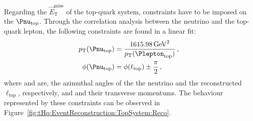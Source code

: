 \begin{comment}
\begin{figure}[h] 
	\begin{subfigure}{0.45\textwidth}
	\texttt{[image: Chapter5\_tHq/Reconstruction/Pzv\_vs\_Pzl\_truth\_alp05]}
	\caption{Truth $p_{z}(\ell_{\text{top}})$ vs. Truth $p_{z}(\nu)$}
	\label{fig:tHq:EventReconstruction:TopSystem:hypothesis1:A}
	\end{subfigure}
\hfill 
	\begin{subfigure}{0.45\textwidth}
	\texttt{[image: Chapter5\_tHq/Reconstruction/Pzv\_vs\_Pzl\_Reco\_alp05]}
	\caption{Reco. $p_{z}(\elll_{\text{top}})$ vs. Reco. \pnutopz}
	\label{fig:tHq:EventReconstruction:TopSystem:hypothesis1:B	}
	\end{subfigure}

\bigskip  
	\begin{subfigure}{0.45\textwidth}
	\texttt{[image: Chapter5\_tHq/Reconstruction/truth\_vs\_reco\_pz\_l\_alp05]}
	\caption{Reco. $p_{z}(\elll_{\text{top}})$ vs. Truth $p_{z}(\ell)$}
	\label{fig:tHq:EventReconstruction:TopSystem:hypothesis1:C}
	\end{subfigure}
\hfill 
	\begin{subfigure}{0.45\textwidth}
	\texttt{[image: Chapter5\_tHq/Reconstruction/truth\_vs\_reco\_pz\_nu\_alp05]}
	\caption{Reconstructed \pnutopz vs Truth \pnutopz}
	\label{fig:tHq:EventReconstruction:TopSystem:hypothesis1:D}
	\end{subfigure}

\caption{Distributions comparing \pnutopz and $p_{z}(\ell_{\text{top}})$
at truth and reconstruction levels for \tHq \dileptau events.} %
\label{fig:tHq:EventReconstruction:TopSystem:hypothesis1}
\end{figure}
\end{comment}


Regarding the $\overrightarrow{E}_{\text{T}}^{\text{miss}}$ of the top-quark system, 
constraints have to be 
imposed on the $\Pnu_{\text{top}}$. Through the correlation analysis between the neutrino and 
the top-quark lepton, the following constraints are found in a linear fit:
\begin{align*}
    \pnutopT & =\frac{1615.98\, \text{GeV}^2}{\pltopT}\,,\\
    \phinutop &= \philtop\pm\frac{\pi}{2}\, ,
\end{align*}
where \phinutop and \philtop are, the azimuthal angles of the 
the neutrino and the reconstructed $\ell_{\text{top}}$, respectively, and 
\pnutopT and \pltopT their transverse momentums. The behaviour represented
by these constraints can be observed in Figure~\ref{fig:tHq:EventReconstruction:TopSystem:Reco}.

